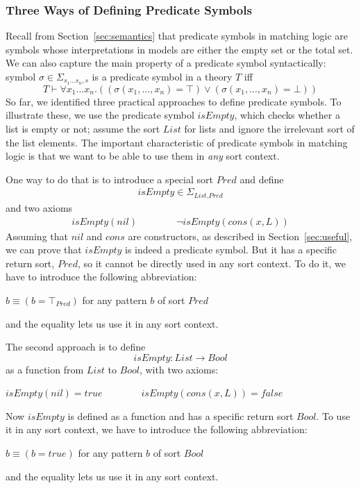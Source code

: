 \documentclass[UTF8,11pt]{article}
\theoremstyle{plain}
\theoremstyle{definition}
\theoremstyle{remark}
\newcommand{\Bool}{\textit{Bool}}
\newcommand{\List}{\textit{List}}
\newcommand{\nil}{\textit{nil}}
\newcommand{\cons}{\textit{cons}}
\newcommand{\ittrue}{\textit{true}}
\newcommand{\itfalse}{\textit{false}}
\newcommand{\Pred}{\textit{Pred}}
\newcommand{\isEmpty}{\textit{isEmpty}}
\begin{document}
\subsubsection{Three Ways of Defining Predicate Symbols}
\label{sec:three-ways-of-defining-predicate-symbols}
Recall from Section~\ref{sec:semantics} that predicate symbols in
matching logic are symbols whose interpretations in models are either the
empty set or the total set.
We can also capture the main property of a predicate symbol syntactically:
symbol $\sigma \in \Sigma_{s_1\ldots s_n,s}$ is a predicate symbol
in a theory $T$ iff
$$ T \vdash \forall x_1 \dots x_n . ((\sigma(x_1,\dots,x_n) = \top) \vee
(\sigma(x_1,\dots,x_n) = \bot))$$
So far, we identified three practical approaches to define predicate symbols.
To illustrate these, we use the predicate symbol $\isEmpty$, which checks
whether a list is empty or not;
assume the sort $\List$ for lists and ignore the irrelevant sort of the list
elements.
The important characteristic of predicate symbols in matching logic is that
we want to be able to use them in \emph{any} sort context.

One way to do that is to introduce a special sort $\Pred$ and define
\begin{align*}
 \isEmpty \in \Sigma_{\List,\Pred}
\end{align*}
and two axioms
\begin{align*}
\isEmpty(\nil) \qquad\qquad \neg \isEmpty(\cons(x,L))
\end{align*}
Assuming that $\nil$ and $\cons$ are constructors, as described in
Section~\ref{sec:useful}, we can prove that $\isEmpty$ is indeed a
predicate symbol.
But it has a specific return sort, $\Pred$, so it cannot be directly used
in any sort context.
To do it, we have to introduce the following abbreviation:
\begin{center}
 $b \equiv (b = \top_\Pred)$ \qquad for any pattern $b$ of sort $\Pred$
\end{center}
and the equality lets us use it in any sort context.

The second approach is to define
$$ \isEmpty \colon \List \to \Bool $$
as a function from $\List$ to $\Bool$, with two axioms:
\begin{center}
 $isEmpty(\nil)=\ittrue \qquad\qquad \isEmpty(\cons(x,L)) = \itfalse$
\end{center}
Now $\isEmpty$ is defined as a function and has a specific return sort $\Bool$.
To use it in any sort context, we have to introduce the following abbreviation:
\begin{center}
 $b \equiv (b = \ittrue)$ \qquad for any pattern $b$ of sort $\Bool$
\end{center}
and the equality lets us use it in any sort context.
\end{document}
